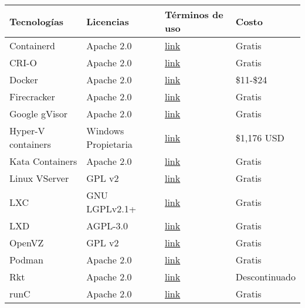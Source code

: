 \begin{table}[H]
\centering
\scriptsize
\setlength{\tabcolsep}{3pt}
\renewcommand{\arraystretch}{1.1}
\begin{tabular}{|>{\centering\arraybackslash}m{}| 
                >{\centering\arraybackslash}m{}| 
                >{\centering\arraybackslash}m{}| 
                >{\centering\arraybackslash}m{}|}
\hline
\textbf{Tecnologías} & \textbf{Licencias} & \textbf{Términos de uso} & \textbf{Costo} \\
\hline
Containerd & Apache 2.0 & \href{https://github.com/containerd/containerd/blob/main/LICENSE}{link} & Gratis \\
\hline
CRI-O & Apache 2.0 & \href{https://github.com/cri-o/cri-o/blob/main/LICENSE}{link} & Gratis \\
\hline
Docker & Apache 2.0 & \href{https://www.docker.com/legal/docker-terms-service/}{link} & \$11-\$24 \\
\hline
Firecracker & Apache 2.0 & \href{https://github.com/firecracker-microvm/firecracker}{link} & Gratis \\
\hline
Google gVisor & Apache 2.0 & \href{https://github.com/google/gvisor}{link} & Gratis \\
\hline
Hyper-V containers & Windows Propietaria & \href{https://learn.microsoft.com/es-es/virtualization/windowscontainers/images-eula}{link} & \$1,176 USD \\
\hline
Kata Containers & Apache 2.0 & \href{https://github.com/kata-containers/kata-containers/blob/main/LICENSE}{link} & Gratis \\
\hline
Linux VServer & GPL v2 & \href{http://linux-vserver.org/}{link} & Gratis \\
\hline
LXC & GNU LGPLv2.1+ & \href{https://linuxcontainers.org/lxc/introduction/}{link} & Gratis \\
\hline
LXD & AGPL-3.0 & \href{https://github.com/canonical/lxd}{link} & Gratis \\
\hline
OpenVZ & GPL v2 & \href{https://openvz.org/}{link} & Gratis \\
\hline
Podman & Apache 2.0 & \href{https://github.com/containers/podman/blob/main/LICENSE}{link} & Gratis \\
\hline
Rkt & Apache 2.0 & \href{https://github.com/rkt/rkt/blob/master/LICENSE}{link} & Descontinuado \\
\hline
runC & Apache 2.0 & \href{https://github.com/opencontainers/runc/blob/main/LICENSE}{link} & Gratis \\

\end{tabular}
\end{table}
